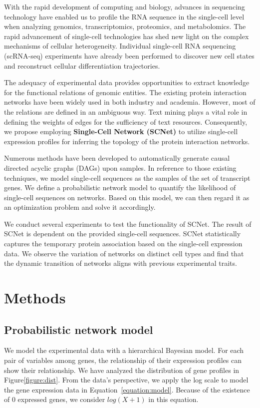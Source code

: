 \documentclass{bioinfo}
\begin{document}
With the rapid development of computing and biology, advances in sequencing technology have enabled us to profile the RNA sequence in the single-cell level when analyzing genomics, transcriptomics, proteomics, and metabolomics. The rapid advancement of single-cell technologies has shed new light on the complex mechanisms of cellular heterogeneity. Individual single-cell RNA sequencing (scRNA-seq) experiments have already been performed to discover new cell states and reconstruct cellular differentiation trajectories.

The adequacy of experimental data provides opportunities to extract knowledge for the functional relations of genomic entities. The existing protein interaction networks have been widely used in both industry and academia. However, most of the relations are defined in an ambiguous way. Text mining plays a vital role in defining the weights of edges for the sufficiency of text resources. Consequently, we propose employing {\bf{Single-Cell Network (SCNet)}} to utilize single-cell expression profiles for inferring the topology of the protein interaction networks.

Numerous methods have been developed to automatically generate causal directed acyclic graphs (DAGs) upon samples. In reference to those existing techniques, we model single-cell sequences as the samples of the set of transcript genes. We define a probabilistic network model to quantify the likelihood of single-cell sequences on networks. Based on this model, we can then regard it as an optimization problem and solve it accordingly.

We conduct several experiments to test the functionality of SCNet. The result of SCNet is dependent on the provided single-cell sequences. SCNet statistically captures the temporary protein association based on the single-cell expression data. We observe the variation of networks on distinct cell types and find that the dynamic transition of networks aligns with previous experimental traits.


\section{Methods}

\subsection{Probabilistic network model}\label{section:model}

We model the experimental data with a hierarchical Bayesian model. For each pair of variables among genes, the relationship of their expression profiles can show their relationship. We have analyzed the distribution of gene profiles in Figure\ref{figure:dist}. From the data's perspective, we apply the log scale to model the gene expression data in Equation~\ref{equation:model}. Because of the existence of 0 expressed genes, we consider $log(X+1)$ in this equation.
\end{document}
